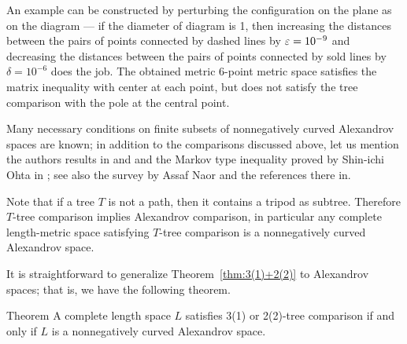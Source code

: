 \begin{wrapfigure}{r}{22 mm}
\vskip-0mm
\end{wrapfigure}

An example can be constructed by perturbing the configuration on the plane as on the diagram ---
if the diameter of diagram is 1, 
then increasing the distances between the pairs of points connected by dashed lines by $\varepsilon=10^{-9}$ and decreasing  the distances between the pairs of points connected by sold lines by $\delta=10^{-6}$ does the job.
The obtained metric 6-point metric space satisfies the matrix inequality with center at each point, but does not satisfy the tree comparison with the pole at the central point.

Many necessary conditions on finite subsets of nonnegatively curved Alexandrov spaces are known;
in addition to the comparisons discussed above, 
let us mention the authors results in \cite{lebedeva-petrunin} and \cite{petrunin}
and the Markov type inequality proved by Shin-ichi Ohta in \cite{ohta};
see also the survey by Assaf Naor \cite{naor} and the references there in.

Note that if a tree $T$ is not a path, then it contains a tripod as subtree.
Therefore $T$-tree comparison implies Alexandrov comparison, in particular any complete length-metric space satisfying $T$-tree comparison is a nonnegatively curved Alexandrov space.

It is straightforward to generalize Theorem~\ref{thm:3(1)+2(2)} to  Alexandrov spaces; that is, we have the following theorem.

\begin{thm}{Theorem}
A complete length space $L$ satisfies  3(1) or 2(2)-tree comparison if and only if $L$ is a nonnegatively curved Alexandrov space.
\end{thm}

